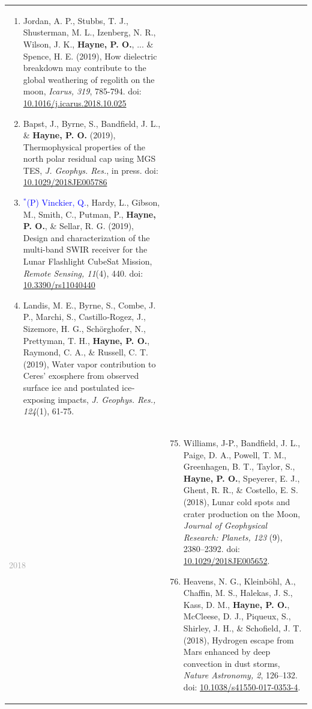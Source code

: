 \documentclass[letterpaper,10pt,twoside]{article}
\begin{document}
\begin{longtable}{@{} p{} p{}}
\begin{enumerate}[leftmargin=!,labelindent=2.5pt,itemindent=-10pt]
             \item{\small Jordan, A. P., Stubbs, T. J., Shusterman, M. L., Izenberg, N. R., Wilson, J. K., \textbf{Hayne, P. O.}, ... \& Spence, H. E. (2019), How dielectric breakdown may contribute to the global weathering of regolith on the moon, {\it Icarus, 319}, 785-794. doi: \href{https://doi.org/10.1016/j.icarus.2018.10.025}{10.1016/j.icarus.2018.10.025}
             }
             \item{\small Bapst, J., Byrne, S., Bandfield, J. L., \& \textbf{Hayne, P. O.} (2019), Thermophysical properties of the north polar residual cap using MGS TES, {\it J. Geophys. Res.}, in press. doi: \href{https://doi.org/10.1029/2018JE005786}{10.1029/2018JE005786}
             }
             \item {\small \textcolor{blue}{$^*$(P) Vinckier, Q.}, Hardy, L., Gibson, M., Smith, C., Putman, P., \textbf{Hayne, P. O.}, \& Sellar, R. G. (2019), Design and characterization of the multi-band SWIR receiver for the Lunar Flashlight CubeSat Mission, {\it Remote Sensing, 11}(4), 440. doi: \href{https://doi.org/10.3390/rs11040440}{10.3390/rs11040440}
             }
             \item {\small Landis, M. E., Byrne, S., Combe, J. P., Marchi, S., Castillo‐Rogez, J., Sizemore, H. G., Sch{\"o}rghofer, N., Prettyman, T. H., \textbf{Hayne, P. O.}, Raymond, C. A., \& Russell, C. T. (2019), Water vapor contribution to Ceres' exosphere from observed surface ice and postulated ice‐exposing impacts, {\it J. Geophys. Res., 124}(1), 61-75.
             }
        \end{enumerate}\\
        \textcolor{darkgray}{2018} & \begin{enumerate}[leftmargin=!,labelindent=2.5pt,itemindent=-10pt]\setcounter{enumi}{74}
             \item{\small Williams, J-P., Bandfield, J. L., Paige, D. A., Powell, T. M., Greenhagen, B. T., Taylor, S., \textbf{Hayne, P. O.}, Speyerer, E. J., Ghent, R. R., \& Costello, E. S. (2018), Lunar cold spots and crater production on the Moon, \textit{Journal of Geophysical Research: Planets, 123} (9), 2380--2392. doi: \href{https://doi.org/10.1029/2018JE005652}{10.1029/2018JE005652}.
             }
             \item{\small Heavens, N. G., Kleinb{\"o}hl, A., Chaffin, M. S., Halekas, J. S., Kass, D. M., \textbf{Hayne, P. O.}, McCleese, D. J., Piqueux, S., Shirley, J. H., \& Schofield, J. T. (2018), Hydrogen escape from Mars enhanced by deep convection in dust storms, \textit{Nature Astronomy, 2}, 126--132. doi: \href{https://doi.org/10.1038/s41550-017-0353-4}{10.1038/s41550-017-0353-4}.
}
\end{enumerate}
\end{longtable}
\end{document}
